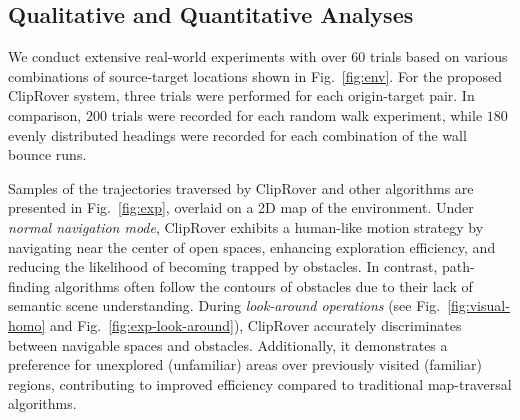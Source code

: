 \subsection{Qualitative and Quantitative Analyses}
We conduct extensive real-world experiments with over $60$ trials based on various combinations of source-target locations shown in Fig.~\ref{fig:env}. For the proposed ClipRover system, three trials were performed for each origin-target pair. In comparison, $200$ trials were recorded for each random walk experiment, while $180$ evenly distributed headings were recorded for each combination of the wall bounce runs.

Samples of the trajectories traversed by ClipRover and other algorithms are presented in Fig.~\ref{fig:exp}, overlaid on a 2D map of the environment. Under \textit{normal navigation mode}, ClipRover exhibits a human-like motion strategy by navigating near the center of open spaces, enhancing exploration efficiency, and reducing the likelihood of becoming trapped by obstacles. In contrast, path-finding algorithms often follow the contours of obstacles due to their lack of semantic scene understanding. During \textit{look-around operations} (see Fig.~\ref{fig:visual-homo} and Fig.~\ref{fig:exp-look-around}), ClipRover accurately discriminates between navigable spaces and obstacles. Additionally, it demonstrates a preference for unexplored (unfamiliar) areas over previously visited (familiar) regions, contributing to improved efficiency compared to traditional map-traversal algorithms.






